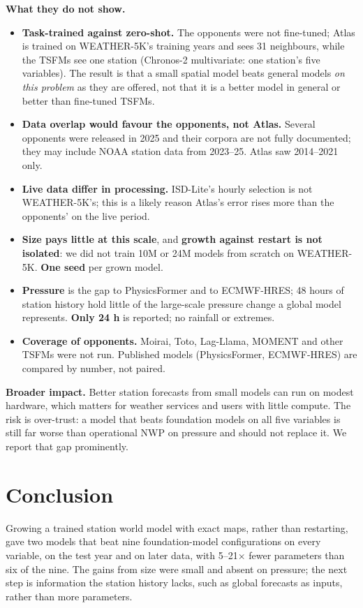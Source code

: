\documentclass{article}
\begin{document}
\textbf{What they do not show.}
\begin{itemize}
\item \textbf{Task-trained against zero-shot.} The opponents were not fine-tuned; Atlas is trained on WEATHER-5K's
training years and sees 31 neighbours, while the TSFMs see one station (Chronos-2 multivariate: one station's five
variables). The result is that a small spatial model beats general models \emph{on this problem} as they are offered,
not that it is a better model in general or better than fine-tuned TSFMs.
\item \textbf{Data overlap would favour the opponents, not Atlas.} Several opponents were released in 2025 and their
corpora are not fully documented; they may include NOAA station data from 2023--25. Atlas saw 2014--2021 only.
\item \textbf{Live data differ in processing.} ISD-Lite's hourly selection is not WEATHER-5K's; this is a likely reason
Atlas's error rises more than the opponents' on the live period.
\item \textbf{Size pays little at this scale}, and \textbf{growth against restart is not isolated}: we did not train
10M or 24M models from scratch on WEATHER-5K. \textbf{One seed} per grown model.
\item \textbf{Pressure} is the gap to PhysicsFormer and to ECMWF-HRES; 48 hours of station history hold little of the
large-scale pressure change a global model represents. \textbf{Only 24 h} is reported; no rainfall or extremes.
\item \textbf{Coverage of opponents.} Moirai, Toto, Lag-Llama, MOMENT and other TSFMs were not run. Published models
(PhysicsFormer, ECMWF-HRES) are compared by number, not paired.
\end{itemize}

\textbf{Broader impact.} Better station forecasts from small models can run on modest hardware, which matters for
weather services and users with little compute. The risk is over-trust: a model that beats foundation models on all
five variables is still far worse than operational NWP on pressure and should not replace it. We report that gap
prominently.

\section{Conclusion}
Growing a trained station world model with exact maps, rather than restarting, gave two models that beat nine
foundation-model configurations on every variable, on the test year and on later data, with 5--21$\times$ fewer
parameters than six of the nine. The gains from size were small and absent on pressure; the next step is information the
station history lacks, such as global forecasts as inputs, rather than more parameters.
\end{document}
